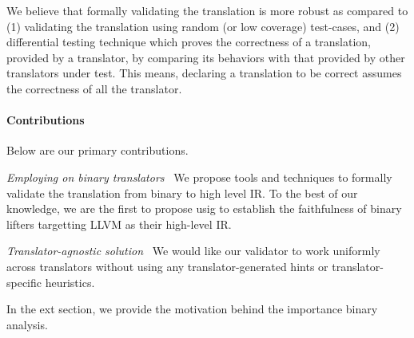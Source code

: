 We believe that formally validating the translation is more robust as
compared to (1) validating the translation using random (or low coverage)
  test-cases, and (2) differential testing technique which proves the
  correctness of a translation, provided by a translator, by comparing its behaviors with
  that provided by other translators under test. This means,
  declaring a translation to be correct assumes the correctness of all the
  translator.

\paragraph{Contributions}
Below are our primary contributions.

\emph{Employing \TV on binary translators~} We propose tools and techniques to
formally validate the translation from binary to high level IR. To the best of
our knowledge, we are the first to propose usig \TV to establish the
faithfulness of binary lifters targetting LLVM as their high-level IR.

\emph{Translator-agnostic solution~} We would like our validator to work
uniformly across translators without using any translator-generated hints or
translator-specific heuristics.


In the ext section, we provide the motivation behind the importance binary analysis.
